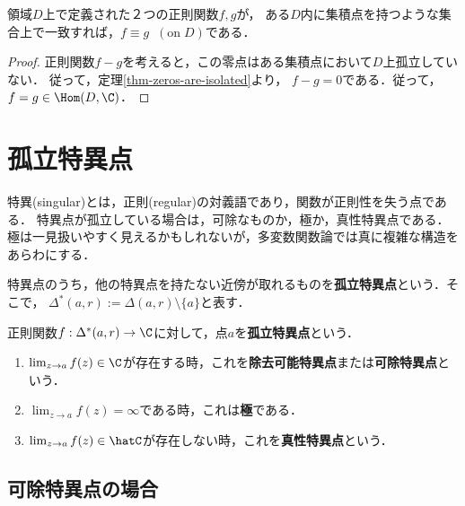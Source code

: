 \documentclass[uplatex, dvipdfmx]{jsreport}
\begin{document}
\begin{corollary}[一致の定理]\label{cor-identity-theorem}
    領域$D$上で定義された２つの正則関数$f,g$が，
    ある$D$内に集積点を持つような集合上で一致すれば，$f\equiv g\;\;(\mathrm{on}\;D)$である．
\end{corollary}
\begin{proof}
    正則関数$f-g$を考えると，この零点はある集積点において$D$上孤立していない．
    従って，定理\ref{thm-zeros-are-isolated}より，
    $f-g=0$である．従って，$f=g\in\Hom(D,\C)$．
\end{proof}

\section{孤立特異点}

\begin{tcolorbox}[colframe=ForestGreen, colback=ForestGreen!10!white,breakable,colbacktitle=ForestGreen!40!white,coltitle=black,fonttitle=\bfseries\sffamily,
title=]
    特異(singular)とは，正則(regular)の対義語であり，関数が正則性を失う点である．
    特異点が孤立している場合は，可除なものか，極か，真性特異点である．
    極は一見扱いやすく見えるかもしれないが，多変数関数論では真に複雑な構造をあらわにする．
\end{tcolorbox}

\begin{notation}
    特異点のうち，他の特異点を持たない近傍が取れるものを\textbf{孤立特異点}という．そこで，
    $\Delta^*(a,r):=\Delta(a,r)\setminus\{a\}$と表す．
\end{notation}

\begin{definition}
    正則関数$f:\Delta^*(a,r)\to\C$に対して，点$a$を\textbf{孤立特異点}という．
    \begin{enumerate}
        \item $\lim_{z\to a}f(z)\in\C$が存在する時，これを\textbf{除去可能特異点}または\textbf{可除特異点}という．
        \item $\lim_{z\to a}f(z)=\infty$である時，これは\textbf{極}である．
        \item $\lim_{z\to a}f(z)\in\hatC$が存在しない時，これを\textbf{真性特異点}という．
    \end{enumerate}
\end{definition}

\subsection{可除特異点の場合}
\end{document}
